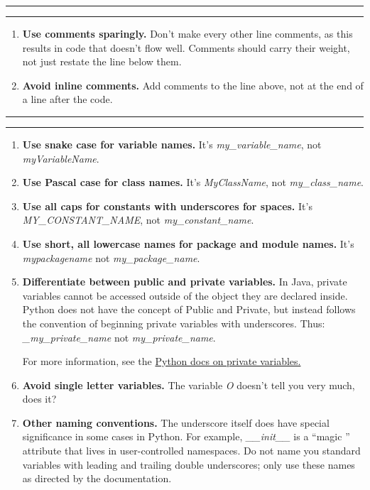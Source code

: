 \documentclass[11pt]{article}
\newcommand{\question}[2] {\vspace{.25in} \hrule\vspace{0.5em}
  \noindent{\bf #1: #2} \vspace{0.5em}
  \hrule \vspace{.10in}}
\begin{document}
\pagebreak

\question{3}{Comments}

\begin{enumerate}
  \item \textbf{Use comments sparingly.} Don't make every other line comments,
    as this results in code that doesn't flow well. Comments should carry their
    weight, not just restate the line below them.
  \item \textbf{Avoid inline comments.} Add comments to the line above, not at
    the end of a line after the code.
  \end{enumerate}

\question{4}{Naming Convention}

\begin{enumerate}
  \item \textbf{Use snake case for variable names.} It's
    \textit{my\_variable\_name}, not \textit{myVariableName}.
  \item \textbf{Use Pascal case for class names.} It's
    \textit{MyClassName}, not \textit{my\_class\_name}.
  \item \textbf{Use all caps for constants with underscores for spaces.} It's
    \textit{MY\_CONSTANT\_NAME}, not \textit{my\_constant\_name}.
  \item \textbf{Use short, all lowercase names for package and module names.}
    It's \textit{mypackagename} not \textit{my\_package\_name}.
  \item \textbf{Differentiate between public and private variables.} In Java, private
    variables cannot be accessed outside of the object they are declared inside.
    Python does not have the concept of Public and Private, but instead follows
    the convention of beginning private variables with underscores. Thus:
    \textit{\_my\_private\_name} not \textit{my\_private\_name}.

    For more information, see the
    \href{https://docs.python.org/3/tutorial/classes.html#private-variables}
    {Python docs on private variables.}
  \item \textbf{Avoid single letter variables.} The variable \textit{O} doesn't
    tell you very much, does it?
  
  \item \textbf{Other naming conventions.} The underscore itself does have
    special significance in some cases in Python. For example,
    \textit{\_\_init\_\_} is a ``magic '' attribute that lives in
    user-controlled namespaces. Do not name you standard variables with leading
    and trailing double underscores; only use these names as directed by the documentation.
\end{enumerate}  
\end{document}
